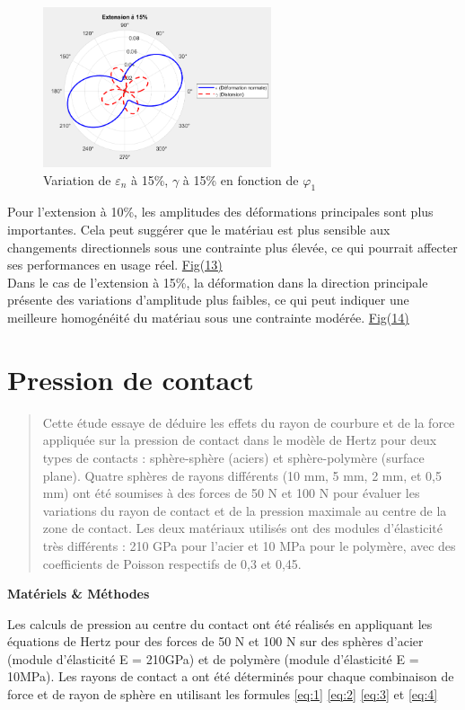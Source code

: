 \documentclass[a4paper,12pt]{article}
\begin{document}
\begin{figure}[H] 
	\centering
	\includegraphics[width=0.6\textwidth]{biop5.png} 
	\caption{Variation de $\varepsilon_n$ à 15\%, $\gamma$ à 15\% en fonction de $\varphi_1$} 
	\label{fig:mon_image14} 
\end{figure}
Pour l'extension à 10\%, les amplitudes des déformations principales sont plus importantes. Cela peut suggérer que le matériau est plus sensible aux changements directionnels sous une contrainte plus élevée, ce qui pourrait affecter ses performances en usage réel. \hyperref[fig:mon_image13]{Fig(13)}\\
Dans le cas de l'extension à 15\%, la déformation dans la direction principale présente des variations d'amplitude plus faibles, ce qui peut indiquer une meilleure homogénéité du matériau sous une contrainte modérée. \hyperref[fig:mon_image14]{Fig(14)}
\clearpage
\section{Pression de contact}

\begin{abstract}
	Cette étude essaye de déduire les effets du rayon de courbure et de la force appliquée sur la pression de contact dans le modèle de Hertz pour deux types de contacts : sphère-sphère (aciers) et sphère-polymère (surface plane). Quatre sphères de rayons différents (10 mm, 5 mm, 2 mm, et 0,5 mm) ont été soumises à des forces de 50 N et 100 N pour évaluer les variations du rayon de contact et de la pression maximale au centre de la zone de contact. Les deux matériaux utilisés ont des modules d'élasticité très différents : 210 GPa pour l'acier et 10 MPa pour le polymère, avec des coefficients de Poisson respectifs de 0,3 et 0,45.
\end{abstract}

\begin{center}
	\textbf{Matériels \& Méthodes}
\end{center}
Les calculs de pression au centre du contact ont été réalisés en appliquant les équations de Hertz pour des forces de 50 N et 100 N sur des sphères d'acier (module d'élasticité  E = 210GPa) et de polymère (module d'élasticité E = 10MPa). Les rayons de contact a ont été déterminés pour chaque combinaison de force et de rayon de sphère en utilisant les formules \eqref{eq:1} \eqref{eq:2} \eqref{eq:3} et \eqref{eq:4}
\end{document}
